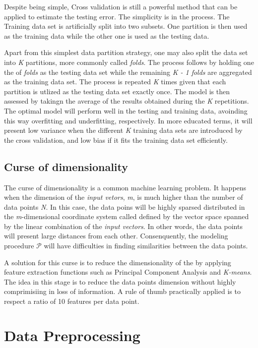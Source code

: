 Despite being simple, Cross validation is still a powerful method that can be 
applied to estimate the testing error. The simplicity is in the process. The 
Training data set is artificially split into two subsets. One partition is then 
used as the training data while the other one is used as the testing data.

Apart from this simplest data partition strategy, one may also split the data set
into \textit{K} partitions, more commonly called \textit{folds}. The process follows
by holding one the of \textit{folds} as the testing data set while the remaining
\textit{K - 1 folds} are aggregated as the training data set. The process is 
repeated \textit{K} times given that each partition is utlized as the testing data
set exactly once. The model is then assessed by takingn the average of the results
obtained during the \textit{K} repetitions. The optimal model will perform well
in the testing and training data, avoinding this way overfitting and underfitting, 
respectively. In more educated terms, it will present low variance when the 
different \textit{K} training data sets are introduced by the cross validation, and
low bias if it fits the training data set efficiently.


\subsection{Curse of dimensionality}

The curse of dimensionality is a common machine learning problem. It happens when
the dimension of the \textit{input vetors}, \textit{m}, is much higher than the 
number of data points \textit{N}. In this case, the data poins will be highly sparsed 
distributed in the \textit{m}-dimensional coordinate system called defined by the 
vector space spanned by the linear combination of the \textit{input vectors}.
In other words, the data points will present large distances from each other.
Consenquently, the modeling procedure $\mathcal{P}$ will have difficulties in
finding similarities between the data points.

A solution for this curse is to reduce the dimensionality of the by applying feature
extraction functions such as Principal Component Analysis and \textit{K-means}. The idea in this
stage is to reduce the data points dimension without highly comprimisiing in loss of
information. A rule of thumb practically applied is to respect a ratio of 10 features
per data point.

\section{Data Preprocessing}

